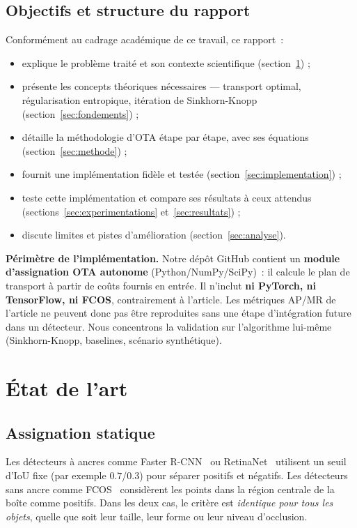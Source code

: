 \documentclass[11pt,a4paper]{article}
\begin{document}
\subsection{Objectifs et structure du rapport}
Conformément au cadrage académique de ce travail, ce rapport~:
\begin{itemize}
  \item explique le problème traité et son contexte scientifique (section~\ref{sec:etat-art}) ;
  \item présente les concepts théoriques nécessaires --- transport optimal, régularisation entropique, itération de Sinkhorn-Knopp (section~\ref{sec:fondements}) ;
  \item détaille la méthodologie d'OTA étape par étape, avec ses équations (section~\ref{sec:methode}) ;
  \item fournit une implémentation fidèle et testée (section~\ref{sec:implementation}) ;
  \item teste cette implémentation et compare ses résultats à ceux attendus (sections~\ref{sec:experimentations} et~\ref{sec:resultats}) ;
  \item discute limites et pistes d'amélioration (section~\ref{sec:analyse}).
\end{itemize}

\textbf{Périmètre de l'implémentation.} Notre dépôt GitHub contient un \textbf{module d'assignation OTA autonome} (Python/NumPy/SciPy)~: il calcule le plan de transport à partir de coûts fournis en entrée. Il n'inclut \textbf{ni PyTorch, ni TensorFlow, ni FCOS}, contrairement à l'article. Les métriques AP/MR de l'article ne peuvent donc pas être reproduites sans une étape d'intégration future dans un détecteur. Nous concentrons la validation sur l'algorithme lui-même (Sinkhorn-Knopp, baselines, scénario synthétique).

\section{État de l'art}
\label{sec:etat-art}

\subsection{Assignation statique}
Les détecteurs à ancres comme Faster R-CNN~\cite{ren2015faster} ou RetinaNet~\cite{lin2017focal} utilisent un seuil d'IoU fixe (par exemple $0.7$/$0.3$) pour séparer positifs et négatifs. Les détecteurs sans ancre comme FCOS~\cite{tian2019fcos} considèrent les points dans la région centrale de la boîte comme positifs. Dans les deux cas, le critère est \emph{identique pour tous les objets}, quelle que soit leur taille, leur forme ou leur niveau d'occlusion.
\end{document}
